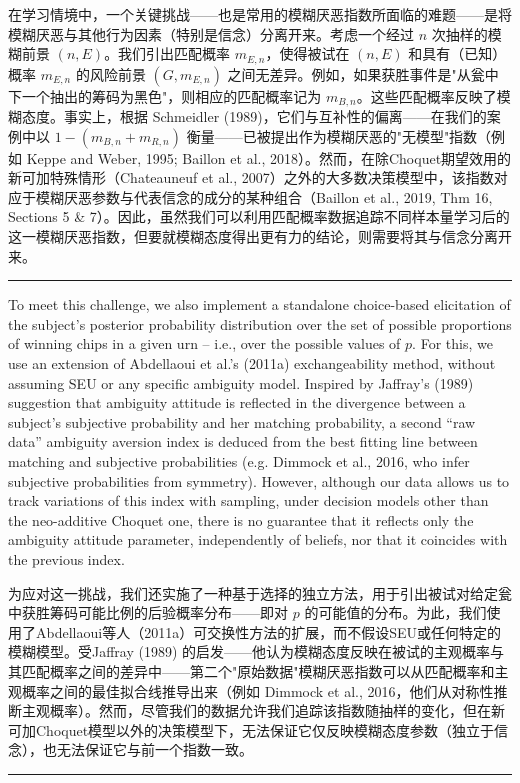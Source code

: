 \documentclass[12pt,a4paper]{article}
\newenvironment{original}
  {\par\vspace{0.5em}\noindent\color{black}\ignorespaces}
  {\par\vspace{0.3em}}
\newenvironment{translation}
  {\par\noindent\color{transblue}\ignorespaces}
  {\par\vspace{0.8em}\hrule\vspace{0.5em}}
\begin{document}
\begin{translation}
在学习情境中，一个关键挑战——也是常用的模糊厌恶指数所面临的难题——是将模糊厌恶与其他行为因素（特别是信念）分离开来。考虑一个经过 $n$ 次抽样的模糊前景 $(n, E)$。我们引出匹配概率 $m_{E,n}$，使得被试在 $(n, E)$ 和具有（已知）概率 $m_{E,n}$ 的风险前景 $(G, m_{E,n})$ 之间无差异。例如，如果获胜事件是"从瓮中下一个抽出的筹码为黑色"，则相应的匹配概率记为 $m_{B,n}$。这些匹配概率反映了模糊态度。事实上，根据 Schmeidler (1989)，它们与互补性的偏离——在我们的案例中以 $1 - (m_{B,n} + m_{R,n})$ 衡量——已被提出作为模糊厌恶的"无模型"指数（例如 Keppe and Weber, 1995; Baillon et al., 2018）。然而，在除Choquet期望效用的新可加特殊情形（Chateauneuf et al., 2007）之外的大多数决策模型中，该指数对应于模糊厌恶参数与代表信念的成分的某种组合（Baillon et al., 2019, Thm 16, Sections 5 \& 7）。因此，虽然我们可以利用匹配概率数据追踪不同样本量学习后的这一模糊厌恶指数，但要就模糊态度得出更有力的结论，则需要将其与信念分离开来。
\end{translation}
\begin{original}
To meet this challenge, we also implement a standalone choice-based elicitation of the subject's posterior probability distribution over the set of possible proportions of winning chips in a given urn -- i.e., over the possible values of $p$. For this, we use an extension of Abdellaoui et al.'s (2011a) exchangeability method, without assuming SEU or any specific ambiguity model. Inspired by Jaffray's (1989) suggestion that ambiguity attitude is reflected in the divergence between a subject's subjective probability and her matching probability, a second ``raw data'' ambiguity aversion index is deduced from the best fitting line between matching and subjective probabilities (e.g. Dimmock et al., 2016, who infer subjective probabilities from symmetry). However, although our data allows us to track variations of this index with sampling, under decision models other than the neo-additive Choquet one, there is no guarantee that it reflects only the ambiguity attitude parameter, independently of beliefs, nor that it coincides with the previous index.
\end{original}

\begin{translation}
为应对这一挑战，我们还实施了一种基于选择的独立方法，用于引出被试对给定瓮中获胜筹码可能比例的后验概率分布——即对 $p$ 的可能值的分布。为此，我们使用了Abdellaoui等人（2011a）可交换性方法的扩展，而不假设SEU或任何特定的模糊模型。受Jaffray (1989) 的启发——他认为模糊态度反映在被试的主观概率与其匹配概率之间的差异中——第二个"原始数据"模糊厌恶指数可以从匹配概率和主观概率之间的最佳拟合线推导出来（例如 Dimmock et al., 2016，他们从对称性推断主观概率）。然而，尽管我们的数据允许我们追踪该指数随抽样的变化，但在新可加Choquet模型以外的决策模型下，无法保证它仅反映模糊态度参数（独立于信念），也无法保证它与前一个指数一致。
\end{translation}
\end{document}
